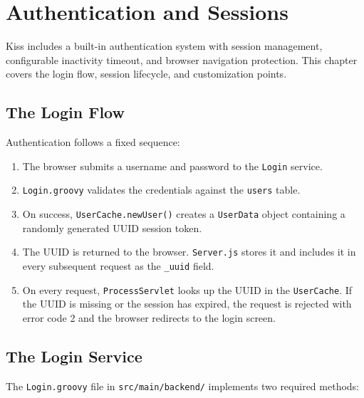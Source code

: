 \chapter{Authentication and Sessions}
\label{ch:authentication}

Kiss includes a built-in authentication system with session management, configurable inactivity timeout, and browser navigation protection.  This chapter covers the login flow, session lifecycle, and customization points.

\section{The Login Flow}
\label{sec:auth-login}

Authentication follows a fixed sequence:

\begin{enumerate}
  \item The browser submits a username and password to the \texttt{Login} service.
  \item \texttt{Login.groovy} validates the credentials against the \texttt{users} table.
  \item On success, \texttt{UserCache.newUser()} creates a \texttt{UserData} object containing a randomly generated UUID session token.
  \item The UUID is returned to the browser.  \texttt{Server.js} stores it and includes it in every subsequent request as the \texttt{\_uuid} field.
  \item On every request, \texttt{ProcessServlet} looks up the UUID in the \texttt{UserCache}.  If the UUID is missing or the session has expired, the request is rejected with error code 2 and the browser redirects to the login screen.
\end{enumerate}

\section{The Login Service}
\label{sec:auth-login-service}

The \texttt{Login.groovy} file in \texttt{src/main/backend/} implements two required methods:

